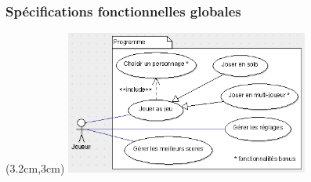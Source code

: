 \begin{frame}
	\frametitle{Spécifications fonctionnelles globales}
	{
		\begin{textblock*}{8cm}(3.2cm,3cm)
			\includegraphics[width=8cm]{figures/use_case_metal_slug_general.png}
		\end{textblock*}
	}
\end{frame}
